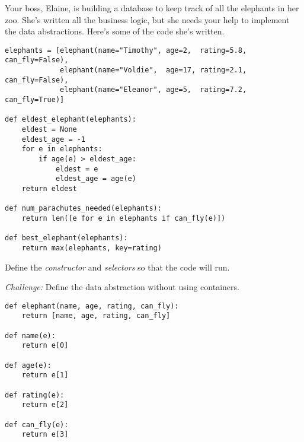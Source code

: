 \begin{blocksection}
\question Your boss, Elaine, is building a database to keep track of all the elephants in her zoo. She's written all the business logic, but she needs your help to implement the data abstractions. Here's some of the code she's written.

\begin{lstlisting}
elephants = [elephant(name="Timothy", age=2,  rating=5.8, can_fly=False),
             elephant(name="Voldie",  age=17, rating=2.1, can_fly=False),
             elephant(name="Eleanor", age=5,  rating=7.2, can_fly=True)]

def eldest_elephant(elephants):
    eldest = None
    eldest_age = -1
    for e in elephants:
        if age(e) > eldest_age:
            eldest = e
            eldest_age = age(e)
    return eldest

def num_parachutes_needed(elephants):
    return len([e for e in elephants if can_fly(e)])

def best_elephant(elephants):
    return max(elephants, key=rating)
\end{lstlisting}

Define the \emph{constructor} and \emph{selectors} so that the code will run.

\emph{Challenge:} Define the data abstraction without using containers.

\end{blocksection}

\pagebreak
\begin{blocksection}
\begin{solution}[3in]
\begin{lstlisting}
def elephant(name, age, rating, can_fly):
    return [name, age, rating, can_fly]

def name(e):
    return e[0]

def age(e):
    return e[1]

def rating(e):
    return e[2]

def can_fly(e):
    return e[3]
\end{lstlisting}
\end{solution}
\end{blocksection}
